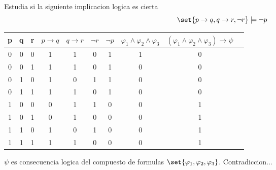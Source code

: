 \begin{example}
	Estudia si la siguiente implicacion logica es cierta
	\[
		\set{p \rightarrow q, q \rightarrow r, \neg r} \models \neg p
	\]

	\begin{table}[H]
		\centering
		\begin{tabular}{|c|c|c|c|c|c|c|c|c|c|}
			\hline
			p & q & r & \(p \rightarrow q \) & \(q \rightarrow r \) & \(\neg r \) & \(\neg p \) & \(\varphi_1 \wedge \varphi_2 \wedge \varphi_3\) & \((\varphi_1 \wedge \varphi_2 \wedge \varphi_3) \rightarrow \psi\) \\ \hline
			\hline
			0 & 0 & 0 & 1                    & 1                    & 0           & 1           & 1                                               & 0                                                                  \\ \hline
			0 & 0 & 1 & 1                    & 1                    & 0           & 1           & 0                                               & 0                                                                  \\ \hline
			0 & 1 & 0 & 1                    & 0                    & 1           & 1           & 0                                               & 0                                                                  \\ \hline
			0 & 1 & 1 & 1                    & 1                    & 0           & 1           & 0                                               & 0                                                                  \\ \hline
			1 & 0 & 0 & 0                    & 1                    & 1           & 0           & 0                                               & 1                                                                  \\ \hline
			1 & 0 & 1 & 0                    & 1                    & 0           & 0           & 0                                               & 1                                                                  \\ \hline
			1 & 1 & 0 & 1                    & 0                    & 1           & 0           & 0                                               & 1                                                                  \\ \hline
			1 & 1 & 1 & 1                    & 1                    & 0           & 0           & 0                                               & 1                                                                  \\
			\hline
		\end{tabular}
		\label{tab:label}
	\end{table}
	\(\psi \) es consecuencia logica del compuesto de formulas \(\set{\varphi_1,\varphi_2,\varphi_3}\).
	Contradiccion...
\end{example}

